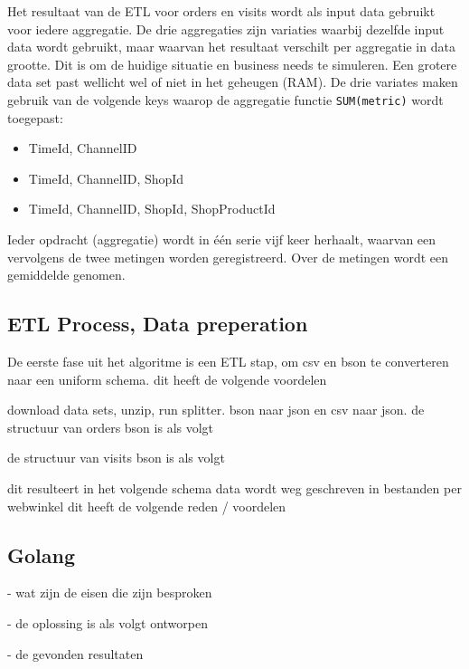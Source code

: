 Het resultaat van de ETL voor orders en visits wordt als input data gebruikt voor iedere aggregatie. De drie aggregaties zijn variaties waarbij dezelfde input data wordt gebruikt, maar waarvan het resultaat verschilt per aggregatie in data grootte. Dit is om de huidige situatie en business needs te simuleren. Een grotere data set past wellicht wel of niet in het geheugen (RAM). De drie variates maken gebruik van de volgende keys waarop de aggregatie functie \verb=SUM(metric)= wordt toegepast:

\begin{itemize}
    \item TimeId, ChannelID
    \item TimeId, ChannelID, ShopId
    \item TimeId, ChannelID, ShopId, ShopProductId
\end{itemize}

Ieder opdracht (aggregatie) wordt in één serie vijf keer herhaalt, waarvan een vervolgens de twee metingen worden geregistreerd. Over de metingen wordt een gemiddelde genomen.

\subsection{ETL Process, Data preperation}

De eerste fase uit het algoritme is een ETL stap, om csv en bson te converteren naar een uniform schema.
dit heeft de volgende voordelen


download data sets, unzip, run splitter. bson naar json en csv naar json.
de structuur van orders bson is als volgt

de structuur van visits bson is als volgt

dit resulteert in het volgende schema
data wordt weg geschreven in bestanden per webwinkel
dit heeft de volgende reden / voordelen


\subsection{Golang}

- wat zijn de eisen die zijn besproken

- de oplossing is als volgt ontworpen

- de gevonden resultaten

